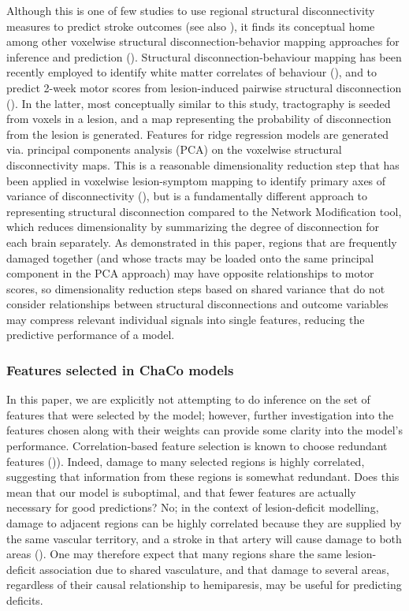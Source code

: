 \documentclass[10pt]{article}
\begin{document}
Although this is one of few studies to use regional structural disconnectivity measures to predict stroke outcomes (see also \cite{Tozlu2020-qa, Kuceyeski2016-vj}), it finds its conceptual home among other voxelwise structural disconnection-behavior mapping approaches for inference and prediction (\cite{Salvalaggio2020-pe, Wawrzyniak2022-kl, Foulon2018-bj, Sperber2022-oj}). Structural disconnection-behaviour mapping has been recently employed to identify white matter correlates of behaviour (\cite{Wawrzyniak2022-kl, Foulon2018-bj}), and to predict 2-week motor scores from lesion-induced pairwise structural disconnection (\cite{Salvalaggio2020-pe}). In the latter, most conceptually similar to this study, tractography is seeded from voxels in a lesion, and a map representing the probability of disconnection from the lesion is generated. Features for ridge regression models are generated via. principal components analysis (PCA) on the voxelwise structural disconnectivity maps. This is a reasonable dimensionality reduction step that has been applied in voxelwise lesion-symptom mapping to identify primary axes of variance of disconnectivity (\cite{Ivanova2021-nh}), but is a fundamentally different approach to representing structural disconnection compared to the Network Modification tool, which reduces dimensionality by summarizing the degree of disconnection for each brain separately. As demonstrated in this paper, regions that are frequently damaged together (and whose tracts may be loaded onto the same principal component in the PCA approach) may have opposite relationships to motor scores, so dimensionality reduction steps based on shared variance that do not consider relationships between structural disconnections and outcome variables may compress relevant individual signals into single features, reducing the predictive performance of a model. 

\subsubsection*{Features selected in ChaCo models}

In this paper, we are explicitly not attempting to do inference on the set of features that were selected by the model; however, further investigation into the features chosen along with their weights can provide some clarity into the model's performance. Correlation-based feature selection is known to choose redundant features (\cite{Guyon2003-kj})). Indeed, damage to many selected regions is highly correlated, suggesting that information from these regions is somewhat redundant. Does this mean that our model is suboptimal, and that fewer features are actually necessary for good predictions? No; in the context of lesion-deficit modelling, damage to adjacent regions can be highly correlated because they are supplied by the same vascular territory, and a stroke in that artery will cause damage to both areas (\cite{Mah2014-cb, Sperber2020-kp}). One may therefore expect that many regions share the same lesion-deficit association due to shared vasculature, and that damage to several areas, regardless of their causal relationship to hemiparesis, may be useful for predicting deficits. 
\end{document}
